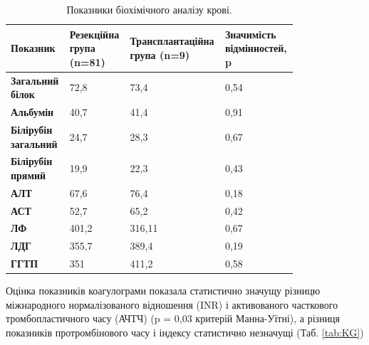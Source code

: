 \begin{table}[]
\centering
\caption{Показники біохімічного аналізу крові.}
\label{tab:BAK}
\begin{tabular}{|p{0.2\linewidth}|
                 p{0.2\linewidth}|
                 p{0.2\linewidth}|
                 p{0.2\linewidth}|}
\hline
{\color[HTML]{231F20} \textbf{Показник}} &
  {\color[HTML]{231F20} \textbf{Резекційна група (n=81)}} &
  {\color[HTML]{231F20} \textbf{Транс\-план\-тацій\-на група (n=9)}} &
  {\color[HTML]{231F20} \textbf{Значимість відмінностей, p}} \\ \hline
{\color[HTML]{231F20} \textbf{Загальний білок}}     & {\color[HTML]{231F20} 72,8} & {\color[HTML]{231F20} 73,4} & 0,54 \\ \hline
{\color[HTML]{231F20} \textbf{Альбумін}}            & {\color[HTML]{231F20} 40,7} & {\color[HTML]{231F20} 41,4} & 0,91 \\ \hline
{\color[HTML]{231F20} \textbf{Білірубін загальний}} & {\color[HTML]{231F20} 24,7} & {\color[HTML]{231F20} 28,3} & 0,67 \\ \hline
{\color[HTML]{231F20} \textbf{Білірубін прямий}}    & {\color[HTML]{231F20} 19,9} & {\color[HTML]{231F20} 22,3} & 0,43 \\ \hline
\textbf{АЛТ}                                        & 67,6                        & 76,4                        & 0,18 \\ \hline
\textbf{АСТ}                                        & 52,7                        & 65,2                        & 0,42 \\ \hline
\textbf{ЛФ}                                         & 401,2                       & 316,11                      & 0,67 \\ \hline
\textbf{ЛДГ}                                        & 355,7                       & 389,4                       & 0,19 \\ \hline
\textbf{ГГТП}                                       & 351                         & 411,2                       & 0,58 \\ \hline
\end{tabular}
\end{table}


Оцінка показників коагулограми показала статистично значущу різницю міжнародного нормалізованого відношення (INR) і активованого часткового тромбопластичного часу (АЧТЧ) (p = 0,03 критерій Манна-Уїтні), а різниця показників протромбінового часу і індексу статистично незначущі (Таб. \ref{tab:KG})

